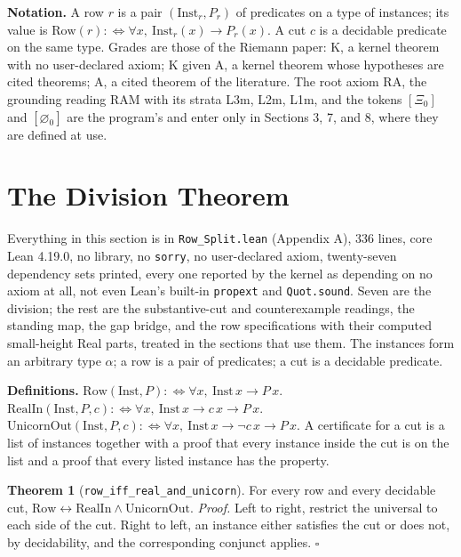 \documentclass[10pt]{article}
\begin{document}
\textbf{Notation.} A row \(r\) is a pair \((\mathrm{Inst}_r, P_r)\) of
predicates on a type of instances; its value is
\(\mathrm{Row}(r) :\Leftrightarrow \forall x,\ \mathrm{Inst}_r(x) \to P_r(x)\).
A cut \(c\) is a decidable predicate on the same type. Grades are those
of the Riemann paper: K, a kernel theorem with no user-declared axiom; K
given A, a kernel theorem whose hypotheses are cited theorems; A, a
cited theorem of the literature. The root axiom \(\mathrm{RA}\), the
grounding reading RAM with its strata L3m, L2m, L1m, and the tokens
\([\Xi_0]\) and \([\varnothing_0]\) are the program's and enter only in
Sections 3, 7, and 8, where they are defined at use.

\hypertarget{the-division-theorem}{%
\section{The Division Theorem}\label{the-division-theorem}}

Everything in this section is in \texttt{Row\_Split.lean} (Appendix A),
336 lines, core Lean 4.19.0, no library, no \texttt{sorry}, no
user-declared axiom, twenty-seven dependency sets printed, every one
reported by the kernel as depending on no axiom at all, not even Lean's
built-in \texttt{propext} and \texttt{Quot.sound}. Seven are the
division; the rest are the substantive-cut and counterexample readings,
the standing map, the gap bridge, and the row specifications with their
computed small-height Real parts, treated in the sections that use them.
The instances form an arbitrary type \(\alpha\); a row is a pair of
predicates; a cut is a decidable predicate.

\textbf{Definitions.}
\(\mathrm{Row}(\mathrm{Inst}, P) :\Leftrightarrow \forall x,\ \mathrm{Inst}\,x \to P\,x\).
\(\mathrm{RealIn}(\mathrm{Inst}, P, c) :\Leftrightarrow \forall x,\ \mathrm{Inst}\,x \to c\,x \to P\,x\).
\(\mathrm{UnicornOut}(\mathrm{Inst}, P, c) :\Leftrightarrow \forall x,\ \mathrm{Inst}\,x \to \neg c\,x \to P\,x\).
A certificate for a cut is a list of instances together with a proof
that every instance inside the cut is on the list and a proof that every
listed instance has the property.

\textbf{Theorem 1} (\texttt{row\_iff\_real\_and\_unicorn}). For every
row and every decidable cut,
\(\mathrm{Row} \leftrightarrow \mathrm{RealIn} \wedge \mathrm{UnicornOut}\).
\emph{Proof.} Left to right, restrict the universal to each side of the
cut. Right to left, an instance either satisfies the cut or does not, by
decidability, and the corresponding conjunct applies. \(\square\)
\end{document}

